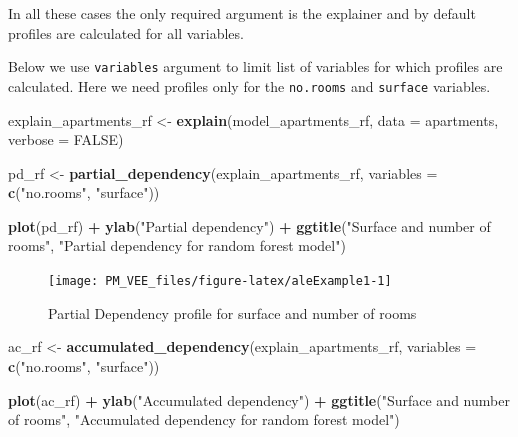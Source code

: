 \documentclass[12pt,]{krantz}
\newenvironment{Shaded}{\begin{snugshade}}{\end{snugshade}}
\newcommand{\DataTypeTok}[1]{\textcolor[rgb]{0.13,0.29,0.53}{#1}}
\newcommand{\KeywordTok}[1]{\textcolor[rgb]{0.13,0.29,0.53}{\textbf{#1}}}
\newcommand{\NormalTok}[1]{#1}
\newcommand{\OperatorTok}[1]{\textcolor[rgb]{0.81,0.36,0.00}{\textbf{#1}}}
\newcommand{\OtherTok}[1]{\textcolor[rgb]{0.56,0.35,0.01}{#1}}
\newcommand{\StringTok}[1]{\textcolor[rgb]{0.31,0.60,0.02}{#1}}
\begin{document}
In all these cases the only required argument is the explainer and by default profiles are calculated for all variables.

Below we use \texttt{variables} argument to limit list of variables for which profiles are calculated. Here we need profiles only for the \texttt{no.rooms} and \texttt{surface} variables.

\begin{Shaded}
\begin{Highlighting}[]
\NormalTok{explain_apartments_rf <-}\StringTok{ }\KeywordTok{explain}\NormalTok{(model_apartments_rf, }
                                 \DataTypeTok{data =}\NormalTok{ apartments,}
                                 \DataTypeTok{verbose =} \OtherTok{FALSE}\NormalTok{)}

\NormalTok{pd_rf <-}\StringTok{ }\KeywordTok{partial_dependency}\NormalTok{(explain_apartments_rf, }\DataTypeTok{variables =} \KeywordTok{c}\NormalTok{(}\StringTok{"no.rooms"}\NormalTok{, }\StringTok{"surface"}\NormalTok{))}

\KeywordTok{plot}\NormalTok{(pd_rf) }\OperatorTok{+}\StringTok{ }\KeywordTok{ylab}\NormalTok{(}\StringTok{"Partial dependency"}\NormalTok{) }\OperatorTok{+}
\StringTok{  }\KeywordTok{ggtitle}\NormalTok{(}\StringTok{"Surface and number of rooms"}\NormalTok{, }\StringTok{"Partial dependency for random forest model"}\NormalTok{) }
\end{Highlighting}
\end{Shaded}

\begin{figure}

{\centering \texttt{[image: PM\_VEE\_files/figure-latex/aleExample1-1]} 

}

\caption{Partial Dependency profile for surface and number of rooms}\label{fig:aleExample1}
\end{figure}

\begin{Shaded}
\begin{Highlighting}[]
\NormalTok{ac_rf <-}\StringTok{ }\KeywordTok{accumulated_dependency}\NormalTok{(explain_apartments_rf, }\DataTypeTok{variables =} \KeywordTok{c}\NormalTok{(}\StringTok{"no.rooms"}\NormalTok{, }\StringTok{"surface"}\NormalTok{))}

\KeywordTok{plot}\NormalTok{(ac_rf) }\OperatorTok{+}\StringTok{ }\KeywordTok{ylab}\NormalTok{(}\StringTok{"Accumulated dependency"}\NormalTok{) }\OperatorTok{+}
\StringTok{  }\KeywordTok{ggtitle}\NormalTok{(}\StringTok{"Surface and number of rooms"}\NormalTok{, }\StringTok{"Accumulated dependency for random forest model"}\NormalTok{) }
\end{Highlighting}
\end{Shaded}
\end{document}
